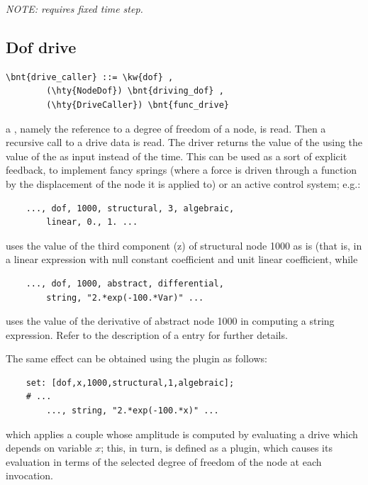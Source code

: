 \noindent
\emph{NOTE: requires fixed time step.}

\subsection{Dof drive}\label{sec:DriveCaller:DOF}
\begin{Verbatim}[commandchars=\\\{\}]
    \bnt{drive_caller} ::= \kw{dof} ,
        (\hty{NodeDof}) \bnt{driving_dof} ,
        (\hty{DriveCaller}) \bnt{func_drive}
\end{Verbatim}
a , 
namely the reference to a degree of freedom of a node, is read. 
Then a recursive call to a drive data is read. 
The driver returns the value of the  
 using the value of the 
 as input instead of the time. 
This can be used as a sort of explicit feedback, to implement fancy
springs (where a force is driven through a function by the displacement
of the node it is applied to) or an active control system; e.g.:
\begin{verbatim}
    ..., dof, 1000, structural, 3, algebraic, 
        linear, 0., 1. ...
\end{verbatim}
uses the value of the third component (z) of structural node 1000 
as is (that is, in a linear expression with null constant coefficient 
and unit linear coefficient, while
\begin{verbatim}
    ..., dof, 1000, abstract, differential, 
        string, "2.*exp(-100.*Var)" ...
\end{verbatim}
uses the value of the derivative of abstract node 1000 in computing 
a string expression.
Refer to the description of a 
entry for further details.

The same effect can be obtained using the  plugin as follows:
\begin{verbatim}
    set: [dof,x,1000,structural,1,algebraic];
    # ...
        ..., string, "2.*exp(-100.*x)" ...
\end{verbatim}
which applies a couple whose amplitude is computed by evaluating
a  drive which depends on variable $x$; this, in turn,
is defined as a  plugin, which causes its evaluation
in terms of the selected degree of freedom of the node at each invocation.

